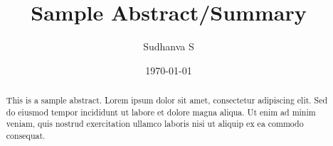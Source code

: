 \documentclass{article}
\title{Sample Abstract/Summary}
\author{Sudhanva S}
\date{\today}
\begin{document}
    \maketitle

    \begin{abstract}
        This is a sample abstract. Lorem ipsum dolor sit amet, consectetur adipiscing elit. Sed do eiusmod
        tempor incididunt ut labore et dolore magna aliqua. Ut enim ad minim veniam, quis nostrud
        exercitation ullamco laboris nisi ut aliquip ex ea commodo consequat.
    \end{abstract}
\end{document}

